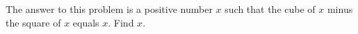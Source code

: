 The answer to this problem is a positive number $x$ such that the cube of $x$ minus the square of $x$ equals $x$. Find $x$.
